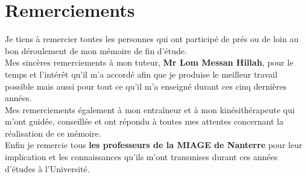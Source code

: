 \chapter*{Remerciements}


Je tiens à remercier toutes les personnes qui ont participé de prés ou de loin au bon déroulement de mon mémoire de fin d'étude. \\

Mes sincères remerciements à mon tuteur, \textbf{Mr Lom Messan Hillah}, pour le temps et l'intérêt qu'il m'a accordé afin que je produise le meilleur travail possible mais aussi pour tout ce qu'il m'a enseigné durant ces cinq dernières années.\\

Mes remerciements également à mon entraîneur et à mon kinésithérapeute qui m'ont guidée, conseillée et ont répondu à toutes mes attentes concernant la réalisation de ce mémoire.\\

Enfin je remercie tous \textbf{les professeurs de la MIAGE de Nanterre} pour leur implication et les connaissances qu'ils m'ont transmises durant ces années d'études à l'Université.